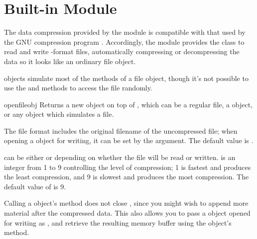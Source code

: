 \section{Built-in Module }
\label{module-gzip}

The data compression provided by the  module is compatible
with that used by the GNU compression program .
Accordingly, the  module provides the  class
to read and write -format files, automatically compressing
or decompressing the data so it looks like an ordinary file object.

 objects simulate most of the methods of a file
object, though it's not possible to use the  and
 methods to access the file randomly.

\renewcommand{\indexsubitem}{(in module gzip)}
\begin{funcdesc}{open}{fileobj}
  Returns a new  object on top of , which
  can be a regular file, a  object, or any object which
  simulates a file.

  The  file format includes the original filename of the
  uncompressed file; when opening a  object for
  writing, it can be set by the  argument.  The default
  value is .

   can be either  or  depending on
  whether the file will be read or written.   is an
  integer from 1 to 9 controlling the level of compression; 1 is
  fastest and produces the least compression, and 9 is slowest and
  produces the most compression.  The default value of
   is 9.

  Calling a  object's  method does not
  close , since you might wish to append more material
  after the compressed data.  This also allows you to pass a
   object opened for writing as , and
  retrieve the resulting memory buffer using the 
  object's  method.
\end{funcdesc}

\begin{seealso}
\end{seealso}

